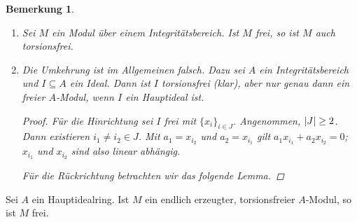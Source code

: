 \documentclass[12pt,a4paper]{scrartcl}
\theoremstyle{cplain}
\theoremstyle{cdef}
\newtheorem{beme}[thmcounter]{Bemerkung}
\begin{document}
\begin{beme}
	\leavevmode
	\begin{enumerate}
		\item Sei $M$ ein Modul über einem Integritätsbereich. Ist $M$ frei, so ist $M$ auch torsionsfrei.
		\item Die Umkehrung ist im Allgemeinen falsch. Dazu sei $A$ ein Integritätsbereich und $I\subseteq A$ ein Ideal. Dann ist $I$ torsionsfrei (klar), aber nur genau dann ein freier $A$-Modul, wenn $I$ ein Hauptideal ist.
	
		\begin{proof}
			Für die Hinrichtung sei $I$ frei mit $\{x_i\}_{i \in J}$. Angenommen, $\lvert J\rvert \ge 2$. Dann existieren $i_1\neq i_2 \in J$. Mit $a_1 = x_{i_2}$ und $a_2 = x_{i_1}$ gilt $a_1x_{i_1} + a_2x_{i_2} = 0$; $x_{i_1}$ und $x_{i_2}$ sind also linear abhängig.

			Für die Rückrichtung betrachten wir das folgende Lemma.
		\end{proof}
	\end{enumerate}
\end{beme}

\begin{lem} \label{lem:4.7}
	Sei $A$ ein Hauptidealring. Ist $M$ ein endlich erzeugter, torsionsfreier $A$-Modul, so ist $M$ frei.
\end{lem}

\end{document}
